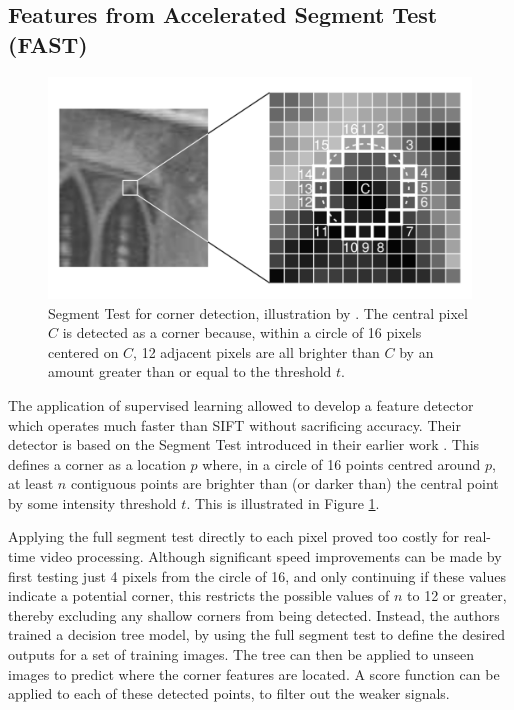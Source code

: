 \documentclass{report}
\begin{document}
\subsection{Features from Accelerated Segment Test (FAST)}
\begin{figure}
\centering
\includegraphics[width=5.5in]{Rosten_Corner_Segment_Test.pdf}
\caption{Segment Test for corner detection, illustration by \cite{rosten2005fusing}. The central pixel $C$ is detected as a corner because, within a circle of 16 pixels centered on $C$, 12 adjacent pixels are all brighter than $C$ by an amount greater than or equal to the threshold $t$.}
\label{fig:rosten}
\end{figure}

The application of supervised learning allowed \cite{rosten2006machine} to develop a feature detector which operates much faster than SIFT without sacrificing accuracy. Their detector is based on the Segment Test introduced in their earlier work \citep{rosten2005fusing}. This defines a corner as a location $p$ where, in a circle of 16 points centred around $p$, at least $n$ contiguous points are brighter than (or darker than) the central point by some intensity threshold $t$. This is illustrated in Figure \ref{fig:rosten}.

Applying the full segment test directly to each pixel proved too costly for real-time video processing. Although significant speed improvements can be made by first testing just 4 pixels from the circle of 16, and only continuing if these values indicate a potential corner, this restricts the possible values of $n$ to 12 or greater, thereby excluding any shallow corners from being detected. Instead, the authors trained a decision tree model, by using the full segment test to define the desired outputs for a set of training images. The tree can then be applied to unseen images to predict where the corner features are located. A score function can be applied to each of these detected points, to filter out the weaker signals.
\end{document}
